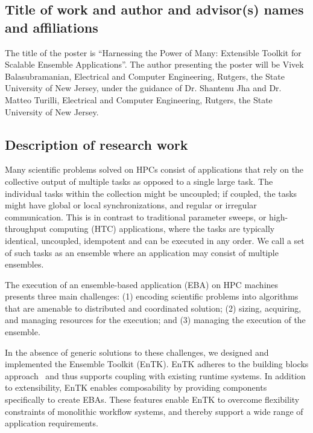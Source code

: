 \subsection{Title of work and author and advisor(s) names and affiliations}

The title of the poster is ``Harnessing the Power of Many: Extensible Toolkit 
for Scalable Ensemble Applications''. The author presenting the poster will be 
Vivek Balasubramanian, Electrical and Computer Engineering, Rutgers, the State 
University of New Jersey, under the guidance of Dr. Shantenu Jha and Dr. Matteo
Turilli, Electrical and Computer Engineering, Rutgers, the State University of 
New Jersey.

\subsection{Description of research work}

Many scientific problems solved on HPCs consist of applications that rely on the
collective output of multiple tasks as opposed to a single large task. The 
individual tasks within the collection might be uncoupled; if coupled, the tasks
might have global or local synchronizations, and regular or irregular 
communication. This is in contrast to traditional parameter sweeps, or 
high-throughput computing (HTC) applications, where the tasks are typically
identical, uncoupled, idempotent and can be executed in any order. We call a
set of such tasks as an ensemble where an application may consist of multiple 
ensembles.

The execution of an ensemble-based application (EBA) on HPC machines presents 
three main challenges: (1) encoding scientific problems into algorithms that are 
amenable to distributed and coordinated solution; (2) sizing, acquiring, and 
managing resources for the execution; and (3) managing the execution of the 
ensemble.

In the absence of generic solutions to these challenges, we designed and 
implemented the Ensemble Toolkit (EnTK). EnTK adheres to the building blocks 
approach~\cite{review_bb_2016} and thus supports coupling with existing runtime 
systems. In addition to extensibility, EnTK enables composability by providing 
components specifically to create EBAs. These features enable EnTK to overcome 
flexibility constraints of monolithic workflow systems, and thereby support a 
wide range of application requirements.

